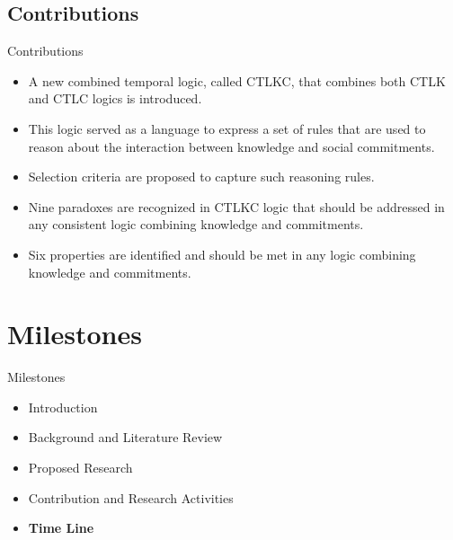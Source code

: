\documentclass{beamer}
\begin{document}
\subsection{Contributions}
    \begin{frame}{Contributions}

    \begin{itemize}
     \itemsep=.35cm
     \item A new combined temporal logic, called CTLKC, that combines both CTLK and CTLC logics is introduced.
     \item This logic served as a language to express a set of rules that are used to reason about the interaction between knowledge and social commitments.
     \item Selection criteria are proposed to capture such reasoning rules.
     \item Nine paradoxes are recognized in CTLKC logic that should be addressed in any consistent logic combining knowledge and commitments.
     \item Six properties are identified and should be met in any logic combining knowledge and commitments.
        \end{itemize}


    \end{frame}



\section{Milestones}
\begin{frame}{Milestones}
    \begin{itemize}
     	\itemsep=.5cm
    	\item Introduction
    	\item Background and Literature Review
    	\item Proposed Research
        \item Contribution and Research Activities
    	\item {\bf Time Line}
    \end{itemize}
\end{frame}
\end{document}
